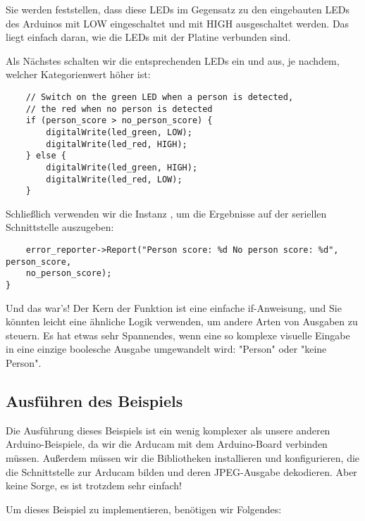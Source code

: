     Sie werden feststellen, dass diese LEDs im Gegensatz zu den eingebauten LEDs des Arduinos mit LOW eingeschaltet und mit HIGH ausgeschaltet werden. Das liegt einfach daran, wie die LEDs mit der Platine verbunden sind.

Als Nächstes schalten wir die entsprechenden LEDs ein und aus, je nachdem, welcher Kategorienwert höher ist:
    
\begin{code}
    \begin{lstlisting}
    // Switch on the green LED when a person is detected,
    // the red when no person is detected
    if (person_score > no_person_score) {
        digitalWrite(led_green, LOW);
        digitalWrite(led_red, HIGH);
    } else {
        digitalWrite(led_green, HIGH);
        digitalWrite(led_red, LOW);
    }
  \end{lstlisting}
\end{code}

    Schließlich verwenden wir die Instanz , um die Ergebnisse auf der seriellen Schnittstelle auszugeben:
    
\begin{code}
    \begin{lstlisting}
    error_reporter->Report("Person score: %d No person score: %d", person_score,
    no_person_score);
}
  \end{lstlisting}
\end{code}

Und das war's! Der Kern der Funktion ist eine einfache if-Anweisung, und Sie könnten leicht eine ähnliche Logik verwenden, um andere Arten von Ausgaben zu steuern. Es hat etwas sehr Spannendes, wenn eine so komplexe visuelle Eingabe in eine einzige boolesche Ausgabe umgewandelt wird: "Person" oder "keine Person".

\subsection{Ausführen des Beispiels}

Die Ausführung dieses Beispiels ist ein wenig komplexer als unsere anderen Arduino-Beispiele, da wir die Arducam mit dem Arduino-Board verbinden müssen. Außerdem müssen wir die Bibliotheken installieren und konfigurieren, die die Schnittstelle zur Arducam bilden und deren JPEG-Ausgabe dekodieren. Aber keine Sorge, es ist trotzdem sehr einfach!

Um dieses Beispiel zu implementieren, benötigen wir Folgendes:

